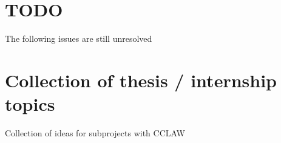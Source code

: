 
\section{TODO}

The following issues are still unresolved

\section{Collection of thesis / internship topics}

Collection of ideas for subprojects with CCLAW



